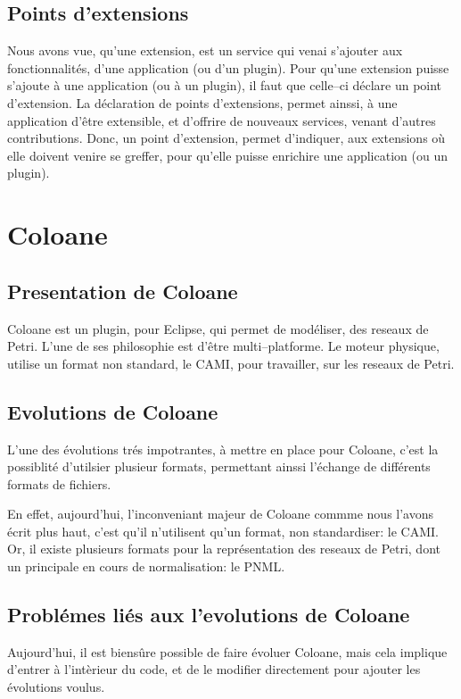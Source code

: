 \documentclass{article}
\begin{document}
\subsection{Points d'extensions}
Nous avons vue, qu'une extension, est un service qui venai s'ajouter aux 
fonctionnalités, d'une application (ou d'un plugin). Pour qu'une extension 
puisse s'ajoute à une application (ou à un plugin), il faut que celle--ci 
déclare un point d'extension. La déclaration de points d'extensions, permet 
ainssi, à une application d'être extensible, et d'offrire de nouveaux services, 
venant d'autres contributions. Donc, un point d'extension, permet d'indiquer, 
aux extensions où elle doivent venire se greffer, pour qu'elle puisse enrichire 
une application (ou un plugin).

\newpage

\section{Coloane}

\subsection{Presentation de Coloane}
Coloane est un plugin, pour Eclipse, qui permet de modéliser, des reseaux de 
Petri. L'une de ses philosophie est d'être multi--platforme. Le moteur 
physique, utilise un format non standard, le CAMI, pour travailler, sur les 
reseaux de Petri. 

\subsection{Evolutions de Coloane}
L'une des évolutions trés impotrantes, à mettre en place pour Coloane, c'est 
la possiblité d'utilsier plusieur formats, permettant ainssi l'échange de 
différents formats de fichiers.

En effet, aujourd'hui, l'inconveniant majeur de Coloane commme nous l'avons 
écrit plus haut, c'est qu'il n'utilisent qu'un format, non standardiser: 
le CAMI. Or, il existe plusieurs formats pour la représentation des reseaux de 
Petri, dont un principale en cours de normalisation: le PNML.

\subsection{Problémes liés aux l'evolutions de Coloane}
Aujourd'hui, il est biensûre possible de faire évoluer Coloane, mais cela 
implique d'entrer à l'intèrieur du code, et de le modifier directement pour 
ajouter les évolutions voulus.
\end{document}
